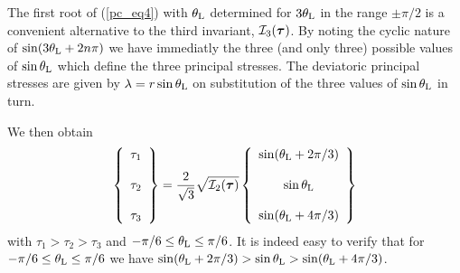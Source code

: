 The first root of (\ref{pc_eq4}) with $\theta_{\rm L}$ determined for $3\theta_{\rm L}$ in the 
range $\pm \pi/2$ is a convenient alternative to the third invariant, ${\cal I}_3({\bm \tau})$. 
By noting the cyclic nature of $\sin (3\theta_{\rm L}+2n \pi)$ we have immediatly the three 
(and only three) possible values of $\sin \theta_{\rm L} $ which define the three principal stresses. 
The deviatoric principal stresses are given by $\lambda=r \sin \theta_{\rm L}$ on substitution 
of the three values of $\sin \theta_{\rm L}$ in turn. 

We then obtain 
\begin{equation}
\left\{
\begin{array}{c}
\tau_1 \\ \\
\tau_2 \\ \\
\tau_3
\end{array}
\right\}
= \frac{2  }{\sqrt{3}}\sqrt{ {\cal I}_2({\bm \tau})  }
\left\{
\begin{array}{c}
\sin (\theta_{\rm L} + 2\pi/3)  \\ \\
\sin \theta_{\rm L}   \\ \\
\sin (\theta_{\rm L} + 4\pi/3  )
\end{array}
\right\}
\end{equation}
with $\tau_1>\tau_2>\tau_3$ and $-\pi/6 \leq \theta_{\rm L} \leq \pi/6$. It is indeed easy to verify that 
for $-\pi/6 \leq \theta_{\rm L} \leq \pi/6$ we have  
$\sin (\theta_{\rm L} + 2\pi/3) > \sin \theta_{\rm L} > \sin (\theta_{\rm L} + 4\pi/3)$.

